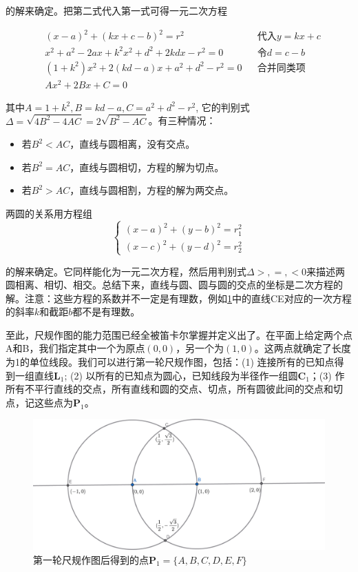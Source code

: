 \documentclass[b5paper]{ctexart}
\begin{document}
的解来确定。把第二式代入第一式可得一元二次方程

\begin{align*}
& (x - a)^2 + (kx + c - b)^2 = r^2  &&\text{代入}y = kx + c \\
& x^2 + a^2 - 2ax + k^2x^2 + d^2 + 2kdx - r^2 =0 && \text{令}d = c - b \\
& (1 + k^2)x^2 + 2(kd - a)x + a^2 + d^2 - r^2 = 0 && \text{合并同类项} \\
& Ax^2 + 2Bx + C = 0
\end{align*}

其中$A = 1 + k^2, B = kd - a, C = a^2 + d^2 - r^2$, 它的判别式$\Delta = \sqrt{4B^2 - 4AC} = 2\sqrt{B^2 - AC}$。有三种情况：
\begin{itemize}
\item 若$B^2 < AC$，直线与圆相离，没有交点。
\item 若$B^2 = AC$，直线与圆相切，方程的解为切点。
\item 若$B^2 > AC$，直线与圆相割，方程的解为两交点。
\end{itemize}

两圆的关系用方程组
\[
\begin{cases}
(x - a)^2 + (y - b)^2 = r_1^2 \\
(x - c)^2 + (y - d)^2 = r_2^2
\end{cases}
\]

的解来确定。它同样能化为一元二次方程，然后用判别式$\Delta >, =, < 0$来描述两圆相离、相切、相交。总结下来，直线与圆、圆与圆的交点的坐标是二次方程的解。注意：这些方程的系数并不一定是有理数，例如\cref{fig:P1}中的直线CE对应的一次方程的斜率$k$和截距$b$都不是有理数。

至此，尺规作图的能力范围已经全被笛卡尔掌握并定义出了。在平面上给定两个点A和B，我们指定其中一个为原点$(0, 0)$，另一个为$(1, 0)$。这两点就确定了长度为1的单位线段。我们可以进行第一轮尺规作图，包括：(1) 连接所有的已知点得到一组直线$\mathbf{L}_1$; (2) 以所有的已知点为圆心，已知线段为半径作一组圆$\mathbf{C}_1$；(3) 作所有不平行直线的交点，所有直线和圆的交点、切点，所有圆彼此间的交点和切点，记这些点为$\mathbf{P}_1$。

\begin{figure}[htbp]
 \centering
 \includegraphics[scale=0.35]{img/P1}
 \caption{第一轮尺规作图后得到的点$\mathbf{P}_1 = \{A, B, C, D, E, F\}$}
 \label{fig:P1}
\end{figure}
\end{document}
